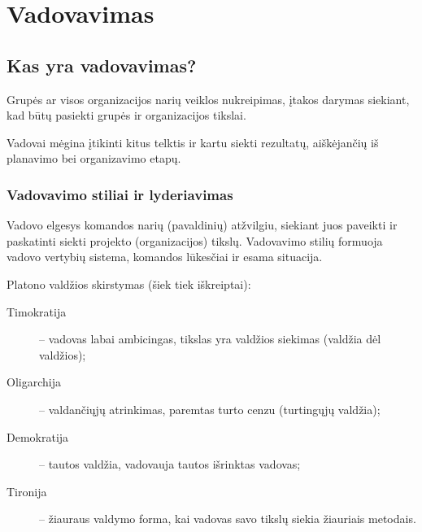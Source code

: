 \chapter{Vadovavimas}

\section{Kas yra vadovavimas?}

\begin{defn}[Vadovavimas]
  Grupės ar visos organizacijos narių veiklos nukreipimas, įtakos
  darymas siekiant, kad būtų pasiekti grupės ir organizacijos tikslai.
\end{defn}

Vadovai mėgina įtikinti kitus telktis ir kartu siekti rezultatų,
aiškėjančių iš planavimo bei organizavimo etapų.

\subsection{Vadovavimo stiliai ir lyderiavimas}

\begin{defn}
  Vadovo elgesys komandos narių (pavaldinių) atžvilgiu, siekiant juos
  paveikti ir paskatinti siekti projekto (organizacijos) tikslų.
  Vadovavimo stilių formuoja vadovo vertybių sistema, komandos lūkesčiai ir
  esama situacija.
\end{defn}

Platono valdžios skirstymas (šiek tiek iškreiptai):
\begin{description}
  \item[Timokratija] – vadovas labai ambicingas, tikslas yra valdžios
    siekimas (valdžia dėl valdžios);
  \item[Oligarchija] – valdančiųjų atrinkimas, paremtas turto cenzu
    (turtingųjų valdžia);
  \item[Demokratija] – tautos valdžia, vadovauja tautos išrinktas vadovas;
  \item[Tironija] – žiauraus valdymo forma, kai vadovas savo tikslų
    siekia žiauriais metodais.
\end{description}

